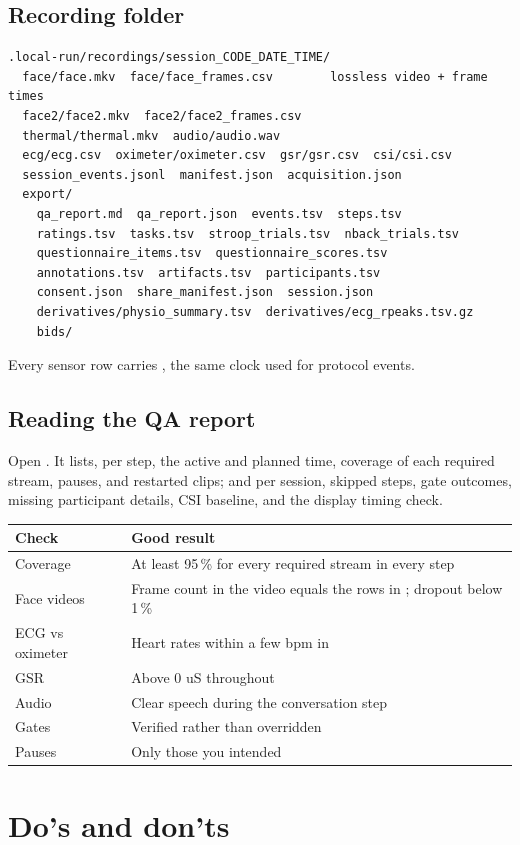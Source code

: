 \documentclass[11pt,a4paper]{article}
\newcommand{\code}[1]{\texttt{\detokenize{#1}}}
\begin{document}
\subsection{Recording folder}
\begin{verbatim}
.local-run/recordings/session_CODE_DATE_TIME/
  face/face.mkv  face/face_frames.csv        lossless video + frame times
  face2/face2.mkv  face2/face2_frames.csv
  thermal/thermal.mkv  audio/audio.wav
  ecg/ecg.csv  oximeter/oximeter.csv  gsr/gsr.csv  csi/csi.csv
  session_events.jsonl  manifest.json  acquisition.json
  export/
    qa_report.md  qa_report.json  events.tsv  steps.tsv
    ratings.tsv  tasks.tsv  stroop_trials.tsv  nback_trials.tsv
    questionnaire_items.tsv  questionnaire_scores.tsv
    annotations.tsv  artifacts.tsv  participants.tsv
    consent.json  share_manifest.json  session.json
    derivatives/physio_summary.tsv  derivatives/ecg_rpeaks.tsv.gz
    bids/
\end{verbatim}
Every sensor row carries \code{host_epoch_ns}, the same clock used for protocol events.

\subsection{Reading the QA report}
Open \code{export/qa_report.md}. It lists, per step, the active and planned time, coverage of each required stream,
pauses, and restarted clips; and per session, skipped steps, gate outcomes, missing participant details, CSI
baseline, and the display timing check.

\begin{tabularx}{\linewidth}{@{}lX@{}}
\toprule
\textbf{Check} & \textbf{Good result} \\
\midrule
Coverage & At least 95\,\% for every required stream in every step \\
Face videos & Frame count in the video equals the rows in \code{*_frames.csv}; dropout below 1\,\% \\
ECG vs oximeter & Heart rates within a few bpm in \code{physio_summary.tsv} \\
GSR & Above 0 uS throughout \\
Audio & Clear speech during the conversation step \\
Gates & Verified rather than overridden \\
Pauses & Only those you intended \\
\bottomrule
\end{tabularx}

\section{Do's and don'ts}
\end{document}
